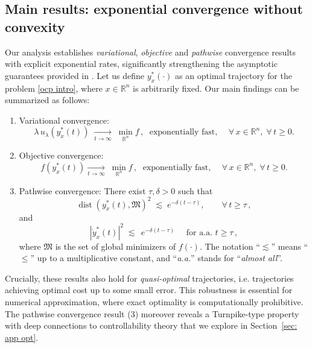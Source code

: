 \documentclass[12pt]{amsart}
\numberwithin{equation}{section}
\theoremstyle{plain}
\begin{document}
\subsection*{Main results: exponential convergence without convexity}
Our analysis establishes \emph{variational}, \emph{objective} and \emph{pathwise} convergence results with explicit exponential rates, significantly strengthening the asymptotic guarantees provided in \cite{huang2025control}. 
Let us define $y^{*}_{x}(\cdot)$ as an optimal trajectory for the problem \eqref{ocp intro}, where $x\in\mathbb{R}^{n}$ is arbitrarily fixed. Our main findings can be summarized as follows:
\begin{enumerate}
	\item Variational convergence: 
	\begin{equation*}
		\lambda\,u_{\lambda}(y_{x}^{*}(t)) \;\xrightarrow[t\to\infty]{}\; \min\limits_{\mathbb{R}^n} f\,,\; \text{ exponentially fast, }\quad \forall\,x\in\mathbb{R}^{n}, \; \forall\,t\geq 0.
	\end{equation*}
	\item Objective convergence: 
	\begin{equation*}
		f\!\left(y_x^*(t)\right)\xrightarrow[t\to\infty]{}\; \min\limits_{\mathbb{R}^n} f\,,\; \text{ exponentially fast, }\quad \forall\,x\in\mathbb{R}^{n}, \; \forall\,t\geq 0.
	\end{equation*}
	\item Pathwise convergence: There exist $\tau,\delta>0$ such that 
	\begin{equation*}
		\operatorname{dist}(y_{x}^{*}(t),\mathfrak{M})^{2} 
		\;  \lesssim \; e^{-\delta(t-\tau)}, \quad \quad \forall\,t\geq\tau\,,
	\end{equation*}
	and
	\begin{equation*}
		|\dot{y}_{x}^{*}(t)|^{2} 
		\;  \lesssim \; \,e^{-\delta(t-\tau)} \quad \text{ for a.a. } t\geq \tau\,,
	\end{equation*}
	where $\mathfrak{M}$ is the set of global minimizers of $f(\cdot)$. The notation ``\;$\lesssim$\;'' means ``\;$\leq$\;'' up to a multiplicative constant, and ``\textit{a.a.}'' stands for ``\textit{almost all}''.
\end{enumerate}
Crucially, these results also hold for \emph{quasi-optimal} trajectories, i.e. trajectories achieving optimal cost up to some small error. This robustness is essential for numerical approximation, where exact optimality is computationally prohibitive. The pathwise convergence result (3) moreover reveals a Turnpike-type property with deep connections to controllability theory that we explore in Section~\ref{sec: app opt}.
\end{document}
